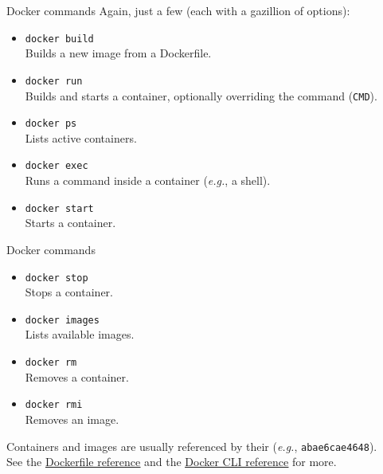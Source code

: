 \begin{frame}{Docker commands}
	Again, just a few (each with a gazillion of options):
	\begin{itemize}
		\item \texttt{docker build}\\Builds a new image from a Dockerfile.
		\item \texttt{docker run}\\Builds and starts a container, optionally overriding the command (\texttt{CMD}).
		\item \texttt{docker ps}\\Lists active containers.
		\item \texttt{docker exec}\\Runs a command inside a container (\emph{e.g.}, a shell).
		\item \texttt{docker start}\\Starts a container.
	\end{itemize}
\end{frame}
\begin{frame}{Docker commands}
	\begin{itemize}
		\item \texttt{docker stop}\\Stops a container.
		\item \texttt{docker images}\\Lists available images.
		\item \texttt{docker rm}\\Removes a container.
		\item \texttt{docker rmi}\\Removes an image.
	\end{itemize}
	Containers and images are usually referenced by their  (\emph{e.g.}, \texttt{abae6cae4648}).\\
	\bigskip
	See the \href{https://docs.docker.com/engine/reference/builder/}{\color{blue}\underline{Dockerfile reference}} and the \href{https://docs.docker.com/engine/reference/commandline/docker/}{\color{blue}\underline{Docker CLI reference}} for more.
\end{frame}


